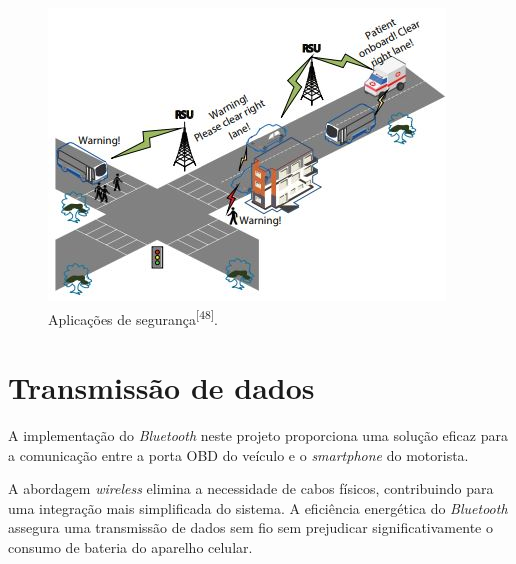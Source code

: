 \begin{figure}[hp]
    \centering
    
    \includegraphics[]{figures/v2x_seguranca.jpg}
    
    \caption{Aplicações de segurança\textsuperscript{[48]}.}
    
    \label{fig:v2x_seguranca}
\end{figure}


\section{Transmissão de dados}

A implementação do \textit{Bluetooth} neste projeto proporciona uma solução eficaz para a comunicação entre a porta OBD do veículo e o \textit{smartphone} do motorista. 


A abordagem \textit{wireless} elimina a necessidade de cabos físicos, contribuindo para uma integração mais simplificada do sistema. A eficiência energética do \textit{Bluetooth} assegura uma transmissão de dados sem fio sem prejudicar significativamente o consumo de bateria do aparelho celular.



    
